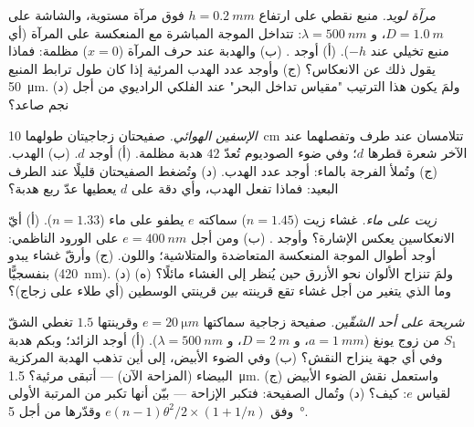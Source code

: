 \begin{exercise}[$\star\star$]\label{exo:b2:two-wave-interference:7}
\emph{مرآة لويد.} منبع نقطي على ارتفاع $h = \qty{0.2}{mm}$ فوق
مرآة مستوية، والشاشة على $D = \qty{1.0}{m}$، و $\lambda = \qty{500}{nm}$: تتداخل الموجة المباشرة
مع المنعكسة على المرآة (أي منبع تخيلي عند
$-h$). (أ) أوجد . (ب) والهدبة عند حرف المرآة ($x = 0$)
مظلمة: فماذا يقول ذلك عن الانعكاس؟ (ج) وأوجد عدد الهدب
المرئية إذا كان طول ترابط المنبع \qty{50}{\micro m}. (د) ولمَ يكون
هذا الترتيب "مقياس تداخل البحر" عند الفلكي الراديوي من أجل نجم صاعد؟
\end{exercise}

\begin{exercise}[$\star\star$]\label{exo:b2:two-wave-interference:8}
\emph{الإسفين الهوائي.} صفيحتان زجاجيتان طولهما \qty{10}{cm} تتلامسان عند طرف
وتفصلهما عند الآخر شعرة قطرها $d$؛ وفي ضوء الصوديوم
تُعدّ $42$ هدبة مظلمة. (أ) أوجد $d$. (ب)  الهدب. (ج) وتُملأ الفرجة
بالماء: أوجد عدد الهدب. (د) وتُضغط الصفيحتان قليلًا عند الطرف البعيد:
فماذا تفعل الهدب، وأي دقة على
$d$ يعطيها عدّ ربع هدبة؟
\end{exercise}

\begin{exercise}[$\star\star$]\label{exo:b2:two-wave-interference:9}
\emph{زيت على ماء.} غشاء زيت ($n = 1.45$) سماكته $e$ يطفو
على ماء ($n = 1.33$). (أ) أيّ الانعكاسين يعكس
الإشارة؟ وأوجد . (ب) ومن أجل $e = \qty{400}{nm}$ على الورود الناظمي:
أوجد أطوال الموجة المنعكسة المتعاضدة والمتلاشية؛ واللون. (ج) وأرقّ
غشاء يبدو بنفسجيًّا (\qty{420}{nm}). (د) ولمَ تنزاح الألوان نحو
الأزرق حين يُنظر إلى الغشاء مائلًا؟ (ه) وما الذي يتغير من أجل غشاء
تقع قرينته \emph{بين} قرينتي الوسطين (أي طلاء على
زجاج)؟
\end{exercise}

\begin{exercise}[$\star\star\star$]\label{exo:b2:two-wave-interference:10}
\emph{شريحة على أحد الشقّين.} صفيحة زجاجية سماكتها $e = \qty{20}{\micro m}$
وقرينتها $1.5$ تغطي الشقّ $S_1$ من زوج يونغ ($a = \qty{1}{mm}$، و $D =
\qty{2}{m}$، و $\lambda = \qty{500}{nm}$). (أ) أوجد  الزائد؛ وبكم هدبة
وفي أي جهة ينزاح النقش؟ (ب) وفي الضوء الأبيض،
إلى أين تذهب الهدبة المركزية البيضاء (المزاحة الآن) --- أتبقى
مرئية؟  \qty{1.5}{\micro m}. (ج) واستعمل نقش الضوء الأبيض
لقياس $e$: كيف؟ (د) وتُمال الصفيحة: فتكبر الإزاحة
--- بيّن أنها تكبر من المرتبة الأولى وفق $e(n - 1)\theta^2/2 \times (1 + 1/n)$
وقدّرها من أجل \qty{5}{\degree}.
\end{exercise}

